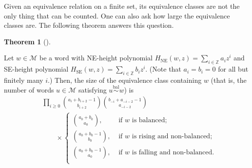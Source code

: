 \documentclass[numbers=enddot,12pt,final,onecolumn,notitlepage]{scrartcl}%
\theoremstyle{definition}
\newtheorem{theo}{Theorem}[section]
\newenvironment{theorem}[1][]
{\begin{theo}[#1]\begin{leftbar}}
{\end{leftbar}\end{theo}}
\newcommand{\M}{\mathcal{M}}
\newcommand{\ZZ}{\mathbb{Z}}
\newcommand{\SE}{\operatorname{SE}}
\newcommand{\NE}{\operatorname{NE}}
\newcommand{\balsim}{\overset{\operatorname*{bal}}{\sim}}
\newcommand{\tup}[1]{\left( #1 \right)}
\begin{document}
Given an equivalence relation on a finite set, its equivalence classes are not
the only thing that can be counted. One can also ask how large the equivalence
classes are. The following theorem answers this question.

\begin{theorem}
Let $w\in\M$ be a word with NE-height polynomial $H_{\NE}\tup{w,z} = \sum\limits_{i\in \ZZ} a_{i}z^{i}$ and SE-height polynomial $H_{\SE}\tup{w,z} = \sum\limits_{i\in \ZZ} b_{i}z^{i}$.
(Note that $a_i = b_i = 0$ for all but finitely many $i$.)
Then, the size of the equivalence class containing $w$ (that is, the number of words $u\in\M$ satisfying $u \balsim w$) is
\begin{align}
&\prod_{i \geq 0} \binom{a_i + b_{i+2} - 1}{b_{i+2}} \binom{b_{-i} + a_{-i-2} - 1}{a_{-i-2}} \nonumber \\
&\qquad\times \begin{cases} \binom{a_0+b_0}{a_0}, & \text{ if $w$ is balanced;} \\
\binom{a_0+b_0-1}{b_0}, & \text{ if $w$ is rising and non-balanced;} \\
\binom{a_0+b_0-1}{a_0}, & \text{ if $w$ is falling and non-balanced.} \\
\end{cases}
\label{eq:size-of-eqclass}
\end{align}
\end{theorem}
\end{document}
